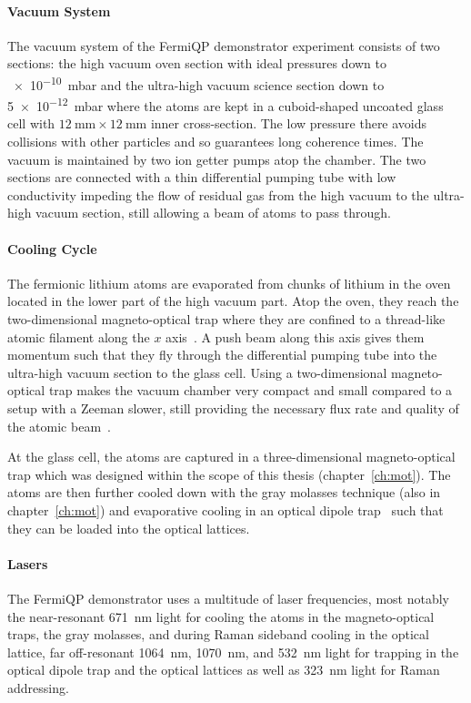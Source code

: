 \paragraph{Vacuum System}
The vacuum system of the FermiQP demonstrator experiment consists of two sections: the high vacuum oven section with ideal pressures down to \SI[]{e-10}{\milli\bar} and the ultra-high vacuum science section down to \SI[]{5e-12}{\milli\bar} where the atoms are kept in a cuboid-shaped uncoated glass cell  with $\SI[]{12}{\milli\meter} \times \SI[]{12}{\milli\meter}$ inner cross-section. The low pressure there avoids collisions with other particles and so guarantees long coherence times. The vacuum is maintained by two ion getter pumps atop the chamber. The two sections are connected with a thin differential pumping tube with low conductivity impeding the flow of residual gas from the high vacuum to the ultra-high vacuum section, still allowing a beam of atoms to pass through.

\paragraph{Cooling Cycle}
The fermionic lithium atoms are evaporated from chunks of lithium in the oven located in the lower part of the high vacuum part. Atop the oven, they reach the two-dimensional magneto-optical trap where they are confined to a thread-like atomic filament along the $x$ axis~\cite{qesja_design_2022}.  A push beam along this axis gives them momentum such that they fly through the differential pumping tube into the ultra-high vacuum section to the glass cell. Using a two-dimensional magneto-optical trap makes the vacuum chamber very compact and small compared to a setup with a Zeeman slower, still providing the necessary flux rate and quality of the atomic beam~\cite{tiecke_high-flux_2009}.

At the glass cell, the atoms are captured in a three-dimensional magneto-optical trap which was designed within the scope of this thesis (chapter~\ref{ch:mot}). The atoms are then further cooled down with the gray molasses technique (also in chapter~\ref{ch:mot}) and evaporative cooling in an optical dipole trap~\cite{sun_construction_2022} such that they can be loaded into the optical lattices.

\paragraph{Lasers}
The FermiQP demonstrator uses a multitude of laser frequencies, most notably the near-resonant \SI[]{671}{\nano\meter} light for cooling the atoms in the magneto-optical traps, the gray molasses, and during Raman sideband cooling in the optical lattice, far off-resonant \SI[]{1064}{\nano\meter}, \SI[]{1070}{\nano\meter}, and \SI[]{532}{\nano\meter} light for trapping in the optical dipole trap and the optical lattices as well as \SI[]{323}{\nano\meter} light for Raman addressing.

